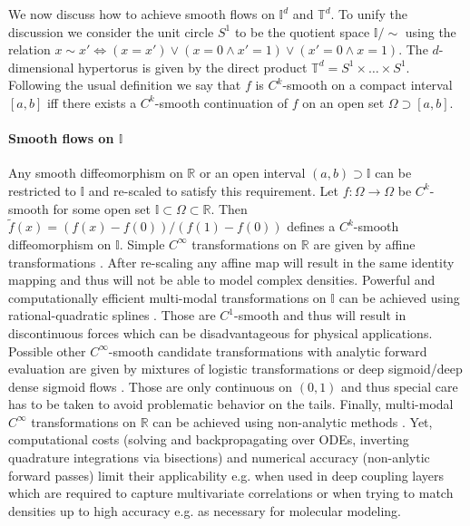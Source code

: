 \documentclass{article}
\begin{document}
We now discuss how to achieve smooth flows on $\mathbb{I}^d$ and $\mathbb{T}^{d}$. To unify the discussion we consider the unit circle $S^1$ to be the quotient space $\mathbb{I}/\sim$ using the relation $x \sim x' \Leftrightarrow (x = x') \lor (x = 0 \land x' = 1) \lor (x' = 0 \land x = 1)$. The $d$-dimensional hypertorus is given by the direct product $\mathbb{T}^d = S^{1} \times \ldots \times S^{1}$. Following the usual definition we say that $f$ is $C^{k}$-smooth on a compact interval $[a, b]$ iff there exists a $C^{k}$-smooth  continuation of $f$ on an open set $\Omega \supset [a,b]$. 

\paragraph{Smooth flows on $\mathbb{I}$}
Any smooth diffeomorphism on $\mathbb{R}$ or an open interval $(a, b) \supset \mathbb{I}$ can be restricted to $\mathbb{I}$ and re-scaled to satisfy this requirement. Let $f \colon \Omega \rightarrow \Omega$ be $C^{k}$-smooth for some open set $\mathbb{I} \subset \Omega \subset \mathbb{R}$. Then $\tilde f(x) = (f(x) - f(0)) / (f(1) - f(0))$
defines a $C^{k}$-smooth diffeomorphism on $\mathbb{I}$. Simple $C^{\infty}$ transformations on $\mathbb{R}$ are given by affine transformations \cite{dinh2016rnvp}. After re-scaling any affine map will result in the same identity mapping and thus will not be able to model complex densities. Powerful and computationally efficient multi-modal transformations on $\mathbb{I}$ can be achieved using rational-quadratic splines \cite{durkan2019neural}. Those are $C^{1}$-smooth and thus will result in discontinuous forces which can be disadvantageous for physical applications. Possible other $C^{\infty}$-smooth candidate transformations with analytic forward evaluation are given by mixtures of logistic transformations \cite{ho2019flow++} or deep sigmoid/deep dense sigmoid flows \cite{huang2018neural}. Those are only continuous on $(0,1)$ and thus special care has to be taken to avoid problematic behavior on the tails. Finally, multi-modal $C^{\infty}$ transformations on $\mathbb{R}$ can be achieved using non-analytic methods \cite{chen2018neural, wehenkel2019unconstrained}. Yet, computational costs (solving and backpropagating over ODEs, inverting quadrature integrations via bisections) and numerical accuracy (non-anlytic forward passes) limit their applicability e.g. when used in deep coupling layers which are required to capture multivariate correlations or when trying to match densities up to high accuracy e.g. as necessary for molecular modeling.%
\end{document}
